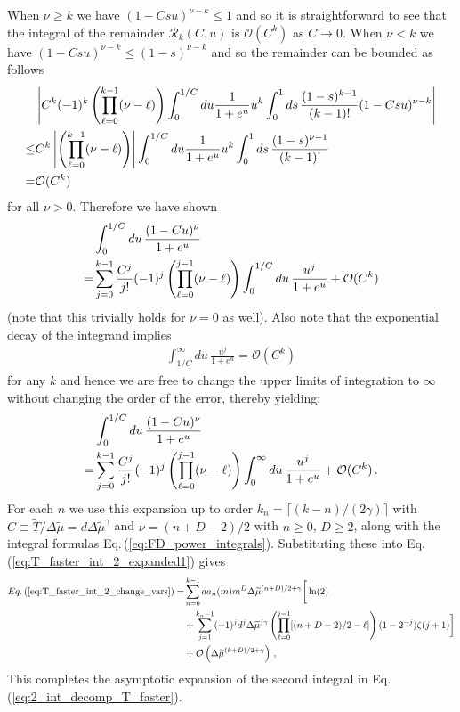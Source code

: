 \documentclass[sn-mathphys,Numbered]{sn-jnl}
\newcommand{\req}[1]{Eq.\,(\ref{#1})}
\begin{document}
When $\nu\geq k$ we have $(1-Csu)^{\nu-k}\leq 1$ and so it is straightforward to see that the integral of the remainder $\mathcal{R}_k(C,u)$ is $\mathcal{O}(C^k)$ as $C\to 0$. When $\nu<k$ we have $(1-Csu)^{\nu-k}\leq (1-s)^{\nu-k}$ and so the remainder can be bounded as follows
\begin{align}
&\left|C^k (-1)^k\left(\prod_{\ell=0}^{k-1}(\nu-\ell)\right)\int_0^{1/C} du \frac{1}{1+e^u} u^k\int_0^1ds\,\frac{(1-s)^{k-1}}{(k-1)!} (1-Csu)^{\nu-k}\right|\notag\\
\leq&C^k\left| \left(\prod_{\ell=0}^{k-1}(\nu-\ell)\right)\right|\int_0^{1/C} du \frac{1}{1+e^u} u^k\int_0^1ds\,\frac{(1-s)^{\nu-1}}{(k-1)!} \notag\\
=&\mathcal{O}(C^k)
\end{align}
for all $\nu>0$. Therefore we have shown
\begin{align}
&\int_0^{1/C} du \,\frac{(1-Cu)^\nu}{1+e^u}\\
=&\sum_{j=0}^{k-1}\frac{C^j}{j!}(-1)^j\left(\prod_{\ell=0}^{j-1}(\nu-\ell) \right)\int_0^{1/C} du \,\frac{u^j}{1+e^u} +\mathcal{O}(C^k)\notag
\end{align}
(note that this trivially holds for $\nu=0$ as well). Also note that the exponential decay of the integrand implies 
\begin{align}
\int_{1/C}^\infty du\, \frac{u^j}{1+e^u}=\mathcal{O}(C^k)
\end{align} for any $k$ and hence we are free to change the upper limits of integration to $\infty$ without changing the order of the error, thereby yielding:
\begin{align}
&\int_0^{1/C} du \,\frac{(1-Cu)^\nu}{1+e^u}\\
=&\sum_{j=0}^{k-1}\frac{C^j}{j!}(-1)^j\left(\prod_{\ell=0}^{j-1}(\nu-\ell) \right)\int_0^{\infty} du \,\frac{u^j}{1+e^u} +\mathcal{O}(C^k)\,.\notag
\end{align}
For each $n$ we use this expansion up to order $k_n= \lceil(k-n)/(2\gamma)\rceil$ with $C\equiv \widetilde{T}/\Delta\widetilde{\mu}=d\Delta\widetilde{\mu}^{\gamma}$ and $\nu=(n+D-2)/2$ with $n\geq 0$, $D\geq 2$, along with the integral formulas 
\req{eq:FD_power_integrals}. Substituting these into \req{eq:T_faster_int_2_expanded1} gives
\begin{align} \label{eq:T_faster_int_2_expanded2}
 \req{eq:T_faster_int_2_change_vars} =&\sum_{n=0}^{k-1} da_n(m)m^{D}\Delta\widetilde{\mu}^{(n+D)/2+\gamma}\bigg[\ln(2)\\
 &+\sum_{j=1}^{k_n-1}(-1)^jd^j\Delta\widetilde{\mu}^{j\gamma}\left(\prod_{\ell=0}^{j-1}[(n+D-2)/2-\ell] \right)(1-2^{-j})\zeta(j+1) \bigg] \notag\\
 &+\mathcal{O}\left(\Delta\widetilde{\mu}^{(k+D)/2+\gamma}\right)\notag\,,
\end{align}
This completes the asymptotic expansion of the second integral in \req{eq:2_int_decomp_T_faster}.
\end{document}

